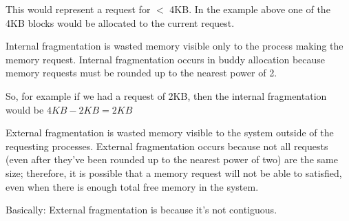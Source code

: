 \documentclass{article}
\begin{document}
\begin{multicols}{2}
    This would represent a request for $<$ 4KB. In the example above one of the 4KB blocks would be
    allocated to the current request.

    Internal fragmentation is wasted memory visible only to the process making the memory request.
    Internal fragmentation occurs in buddy allocation because memory requests must be rounded up to
    the nearest power of 2.

    So, for example if we had a request of 2KB, then the internal fragmentation would be $4KB - 2KB
    = 2KB$

    External fragmentation is wasted memory visible to the system outside of the requesting
    processes. External fragmentation occurs because not all requests (even after they've been
    rounded up to the nearest power of two) are the same size; therefore, it is possible that a
    memory request will not be able to satisfied, even when there is enough total free memory in the
    system.

    Basically: External fragmentation is because it's not contiguous.
  \end{multicols}
\end{document}
